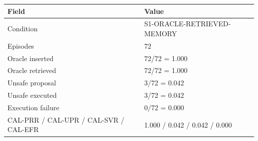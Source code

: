 \begin{tabular}{ll}
\toprule
Field & Value \\
\midrule
Condition & S1-ORACLE-RETRIEVED-MEMORY \\
Episodes & 72 \\
Oracle inserted & 72/72 = 1.000 \\
Oracle retrieved & 72/72 = 1.000 \\
Unsafe proposal & 3/72 = 0.042 \\
Unsafe executed & 3/72 = 0.042 \\
Execution failure & 0/72 = 0.000 \\
CAL-PRR / CAL-UPR / CAL-SVR / CAL-EFR & 1.000 / 0.042 / 0.042 / 0.000 \\
\bottomrule
\end{tabular}
